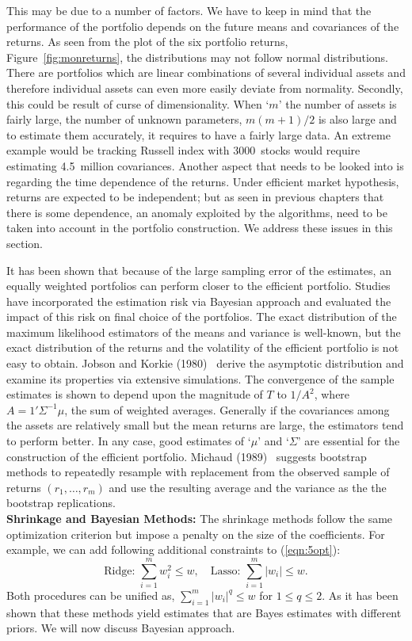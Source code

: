 This may be due to a number of factors. We have to keep in mind that the performance of the portfolio depends on the future means and covariances of the returns. As seen from the plot of the six portfolio returns, Figure~\ref{fig:monreturns}, the distributions may not follow normal distributions. There are portfolios which are linear combinations of several individual assets and therefore individual assets can even more easily deviate from normality. Secondly, this could be result of curse of dimensionality. When `$m$' the number of assets is fairly large, the number of unknown parameters, $m(m+1)/2$ is also large and to estimate them accurately, it requires to have a fairly large data. An extreme example would be tracking Russell index with 3000~stocks would require estimating 4.5~million covariances. Another aspect that needs to be looked into is regarding the time dependence of the returns. Under efficient market hypothesis, returns are expected to be independent; but as seen in previous chapters that there is some dependence, an anomaly exploited by the algorithms, need to be taken into account in the portfolio construction. We address these issues in this section. 


It has been shown that because of the large sampling error of the estimates, an equally weighted portfolios can perform closer to the efficient portfolio. Studies have incorporated the estimation risk via Bayesian approach and evaluated the impact of this risk on final choice of the portfolios. The exact distribution of the maximum likelihood estimators of the means and variance is well-known, but the exact distribution of the returns and the volatility of the efficient portfolio is not easy to obtain. Jobson and Korkie (1980)~\cite{jobkor} derive the asymptotic distribution and examine its properties via extensive simulations. The convergence of the sample estimates is shown to depend upon the magnitude of $T$ to $1/A^2$, where $A=1' \Sigma^{-1}\mu$, the sum of weighted averages. Generally if the covariances among the assets are relatively small but the mean returns are large, the estimators tend to perform better. In any case, good estimates of `$\mu$' and `$\Sigma$' are essential for the construction of the efficient portfolio. Michaud (1989)~\cite{michaud} suggests bootstrap methods to repeatedly resample with replacement from the observed sample of returns $(r_1,\ldots,r_m)$ and use the resulting average and the variance as the the bootstrap replications. \\


\noindent \textbf{Shrinkage and Bayesian Methods:} The shrinkage methods follow the same optimization criterion but impose a penalty on the size of the coefficients. For example, we can add following additional constraints to (\ref{eqn:5opt}):
	\begin{equation} \label{eqn:addconstraint}
	\text{Ridge: } \sum_{i=1}^m w_i^2 \leq w, \quad \text{Lasso: }\sum_{i=1}^m |w_i| \leq w.
	\end{equation}
Both procedures can be unified as, $\sum_{i=1}^m |w_i|^q \leq w$ for $1 \leq q \leq 2$. As it has been shown that these methods yield estimates that are Bayes estimates with different priors. We will now discuss Bayesian approach. 


